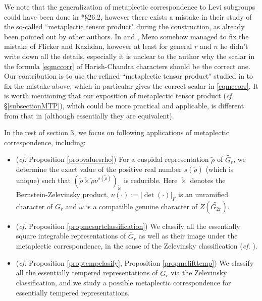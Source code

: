 \documentclass{amsart}
\numberwithin{equation}{section}
\newcommand{\abs}[1]{\left|#1\right|_{F}}
\newcommand{\mrdet}{\operatorname{det}}
\newcommand{\wt}[1]{\widetilde{#1}}
\begin{document}
	We note that the generalization of metaplectic correspondence to Levi subgroups could have been done in \cite{flicker1986metaplectic}*{\S 26.2}, however there exists a mistake in their study of the so-called ``metaplectic tensor product" during the construction, as already been pointed out by other authors. In \cite{mezo2002comparisons} and \cite{mezo2004metaplectic}, Mezo somehow managed to fix the mistake of Flicker and Kazhdan, however at least for general $r$ and $n$ he didn't write down all the details, especially it is unclear to the author why the scalar in the formula \eqref{eqmccorr} of Harish-Chandra characters should be the correct one. Our contribution is to use the refined ``metaplectic tensor product" studied in \cite{kaplan2022classification} to fix the mistake above, which in particular gives the correct scalar in \eqref{eqmccorr}. It is worth mentioning that our exposition of metaplectic tensor product (\emph{cf.} \S \ref{subsectionMTP}), which could be more practical and applicable, is different from that in \cite{kaplan2022classification} (although essentially they are equivalent).
	
	In the rest of section 3, we focus on following applications of metaplectic correspondence, including:
	\begin{itemize}
		
		\item (\emph{cf.} Proposition \ref{propvaluesrho}) For a cuspidal representation $\wt{\rho}$ of $\wt{G_r}$, we determine the exact value of the positive real number $s(\wt{\rho})$ (which is unique) such that $(\wt{\rho}\wt{\times}\wt{\rho}\nu^{s(\wt{\rho})})_{\wt{\omega}}$ is reducible. Here $\wt{\times}$ denotes the Bernstein-Zelevinsky product, $\nu(\cdot):=\abs{\mrdet(\cdot)}$ is an unramified character of $G_{r}$ and $\wt{\omega}$ is a compatible genuine character of $Z(\wt{G_{2r}})$. 
		
		\item (\emph{cf.} Proposition \ref{propmcsqrtclassification}) We classify all the essentially square integrable representations of $\wt{G_{r}}$ as well as their image under the metaplectic correspondence, in the sense of the Zelevinsky classification (\emph{cf.} \cite{kaplan2022classification}).
		
		\item (\emph{cf.} Proposition \ref{proptempclasify}, Proposition \ref{propmclifttemp}) We classify all the essentially tempered representations of $\wt{G_{r}}$ via the Zelevinsky classification, and we study a possible metaplectic correspondence for essentially tempered representations.
		
	\end{itemize}
	
\end{document}
